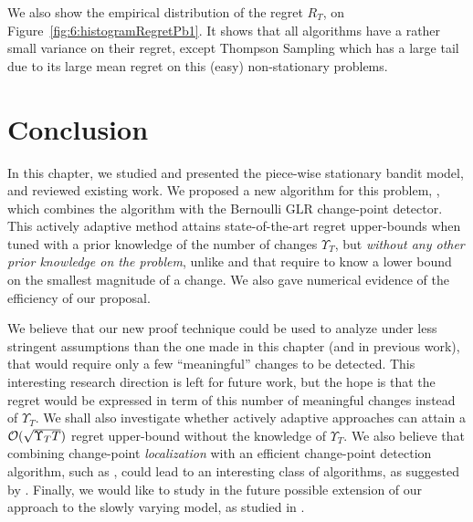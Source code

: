 We also show the empirical distribution of the regret $R_T$, on Figure~\ref{fig:6:histogramRegretPb1}. It shows that all algorithms have a rather small variance on their regret, except Thompson Sampling which has a large tail due to its large mean regret on this (easy) non-stationary problems.



\section{Conclusion}
\label{sub:6:conclusion}

In this chapter, we studied and presented the piece-wise stationary bandit model, and reviewed existing work.
%
We proposed a new algorithm for this problem, \GLRklUCB, which combines the \klUCB{} algorithm with the Bernoulli GLR change-point detector. This actively adaptive method attains state-of-the-art regret upper-bounds when tuned with a prior knowledge of the number of changes $\Upsilon_T$, but \emph{without any other prior knowledge on the problem}, unlike \CUSUMUCB{} and \MUCB{} that require to know a lower bound on the smallest magnitude of a change. We also gave numerical evidence of the efficiency of our proposal.

We believe that our new proof technique could be used to analyze \GLRklUCB{} under less stringent assumptions than the one made in this chapter (and in previous work), that would require only a few ``meaningful'' changes to be detected. This interesting research direction is left for future work,  but the hope is that the regret would be expressed in term of this number of meaningful changes instead of $\Upsilon_T$. We shall also investigate whether actively adaptive approaches can attain a $\mathcal{O}(\sqrt{\Upsilon_T T})$ regret upper-bound without the knowledge of $\Upsilon_T$.
We also believe that combining change-point \emph{localization} with an efficient change-point detection algorithm, such as \GLRklUCB, could lead to an interesting class of algorithms, as suggested by \cite{Maillard2018GLR}.
Finally, we would like to study in the future possible extension of our approach to the slowly varying model, as studied in \cite{Besbes14stochastic,WeiSrivastava18Abruptly}.


